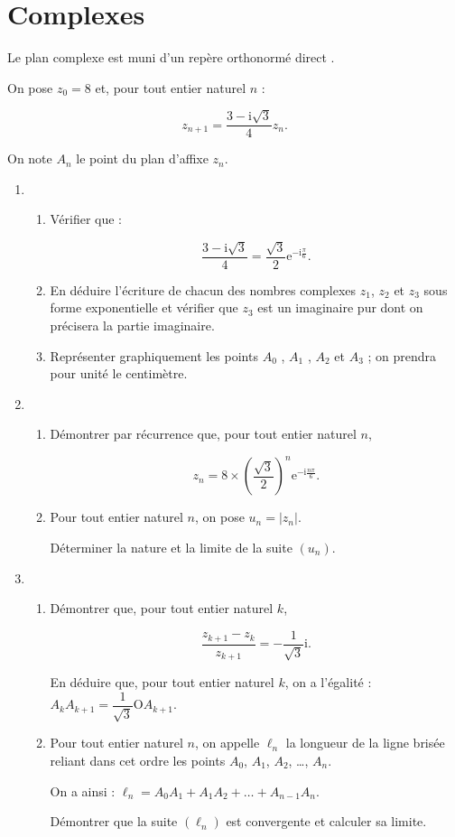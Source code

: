 \documentclass{cornouaille}
\begin{document}
\section{Complexes}
\begin{exercice}

Le plan complexe est muni d'un repère orthonormé direct \Ouv.

On pose $z_0 = 8$ et, pour tout entier naturel $n$ :

\[z_{n+1} = \dfrac{3 - \text{i}\sqrt{3}}{4}z_n.\]

On note $A_n$ le point du plan d'affixe $z_n$.

\medskip

\begin{enumerate}
\item 
	\begin{enumerate}
		\item Vérifier que :
		
\[\dfrac{3 - \text{i}\sqrt{3}}{4} = \dfrac{\sqrt{3}}{2}\text{e}^{- \text{i}\frac{\pi}{6}}.\]
		
		\item En déduire l'écriture de chacun des nombres complexes $z_1$,  $z_2$ et $z_3$ sous forme exponentielle et vérifier que $z_3$ est un imaginaire pur dont on précisera la partie imaginaire.
		\item Représenter graphiquement les points $A_0$ , $A_1$ , $A_2$ et $A_3$ ; on prendra pour unité le centimètre.
 	\end{enumerate}
\item
	\begin{enumerate}
		\item Démontrer par récurrence que, pour tout entier naturel $n$,
		
\[z_n = 8 \times \left(\dfrac{\sqrt{3}}{2}\right)^n \text{e}^{- \text{i}\frac{n\pi}{6}}.\]
		
		\item Pour tout entier naturel $n$, on pose $u_n = \left|z_n\right|$.
		
Déterminer la nature et la limite de la suite $\left(u_n\right)$.
	\end{enumerate}
\item 
	\begin{enumerate}
		\item Démontrer que, pour tout entier naturel $k$,
		
		\[\dfrac{z_{k+1} - z_{k}}{z_{k+1}} = - \dfrac{1}{\sqrt{3}}\text{i}.\]

En déduire que, pour tout entier naturel $k$, on a l'égalité : $A_kA_{k+1} = \dfrac{1}{\sqrt{3}} \text{O}A_{k+1}$.
		\item Pour tout entier naturel $n$, on appelle $\ell_n$ la longueur de la ligne brisée reliant dans cet ordre les points $A_0$,\: $A_1$,\: $A_2$, \ldots , $A_n$.
		
On a ainsi : $\ell_n = A_0A_1 + A_1A_2 + \ldots + A_{n-1}A_n$.
		
Démontrer que la suite $\left(\ell_n\right)$ est convergente et calculer sa limite.
	\end{enumerate}
\end{enumerate}
\end{exercice}
\end{document}
